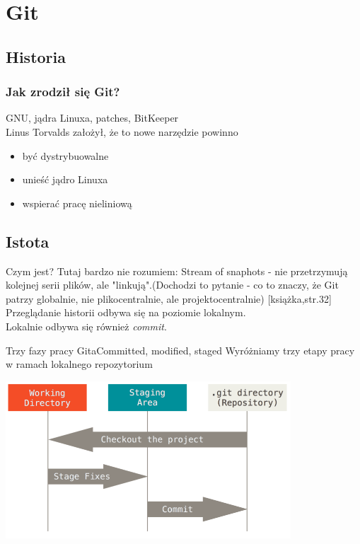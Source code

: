 \documentclass{beamer}
\begin{document}
\section{Git}
\subsection{Historia}
\begin{frame}
 \frametitle{Jak zrodził się Git?}
GNU, jądra Linuxa, patches, BitKeeper \\
Linus Torvalds założył, że to nowe narzędzie powinno \\
  \begin{itemize}
  \item być dystrybuowalne
  \item unieść jądro Linuxa
  \item wspierać pracę nieliniową
 \end{itemize}
\end{frame}

\subsection{Istota}
\begin{frame}{Czym jest?}
 Tutaj bardzo nie rozumiem:
 Stream of snaphots - nie przetrzymują kolejnej serii plików, ale "linkują".(Dochodzi to pytanie - co to znaczy, że Git patrzy globalnie, nie plikocentralnie, ale projektocentralnie)
 [książka,str.32]\\
 Przeglądanie historii odbywa się na poziomie lokalnym.\\
 Lokalnie odbywa się również \textit{commit}.\\
\end{frame}

\begin{frame}{Trzy fazy pracy Gita}{Committed, modified, staged}
 Wyróżniamy trzy etapy pracy w ramach lokalnego repozytorium
  \begin{center}
   \includegraphics[width=0.8\textwidth]{./obrazki/fig-1_6.png}
 \end{center}
\end{frame}
\end{document}
